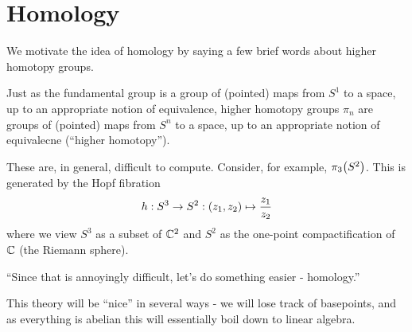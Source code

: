 \chapter{Homology}
\thispagestyle{empty}

We motivate the idea of homology by saying a few brief words about higher homotopy groups.

Just as the fundamental group is a group of (pointed) maps from $S^1$ to a space, up to an appropriate notion of equivalence, higher homotopy groups $\pi_n$ are groups of (pointed) maps from $S^n$ to a space, up to an appropriate notion of equivalecne (``higher homotopy'').

These are, in general, difficult to compute. Consider, for example, $\pi_3\!\left( S^2 \right)$. This is generated by the Hopf fibration \cite[Chapitre 6]{EPFLTopologie}
\begin{align*}
    h : S^3 \to S^2 : \left( z_1, z_2 \right) \mapsto \frac{z_1}{z_2}
\end{align*}
where we view $S^3$ as a subset of $\mathbb{C}^2$ and $S^2$ as the one-point compactification of $\mathbb{C}$ (the Riemann sphere).

``Since that is annoyingly difficult, let's do something easier - homology.''

This theory will be ``nice'' in several ways - we will lose track of basepoints, and as everything is abelian this will essentially boil down to linear algebra.


